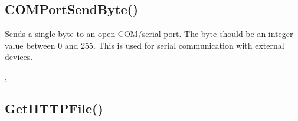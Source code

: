 \documentclass[letterpaper,10pt,english]{sphinxmanual}
\begin{document}
\ignorespaces 

\subsection{COMPortSendByte()}
\label{\detokenize{reference/peblstream:comportsendbyte}}\label{\detokenize{reference/peblstream:index-38}}
\sphinxAtStartPar
{}

\sphinxAtStartPar
{}

\sphinxAtStartPar
Sends a single byte to an open COM/serial port. The byte should be an integer value between 0 and 255. This is used for serial communication with external devices.

\sphinxAtStartPar
{}

\begin{sphinxVerbatim}[commandchars=\\\{\}]
\end{sphinxVerbatim}

\sphinxAtStartPar
{}

\begin{sphinxVerbatim}[commandchars=\\\{\}]
\end{sphinxVerbatim}

\sphinxAtStartPar
{}

\sphinxAtStartPar
{}, 

\ignorespaces 

\subsection{GetHTTPFile()}
\label{\detokenize{reference/peblstream:gethttpfile}}\label{\detokenize{reference/peblstream:index-39}}
\sphinxAtStartPar
{}
\end{document}
